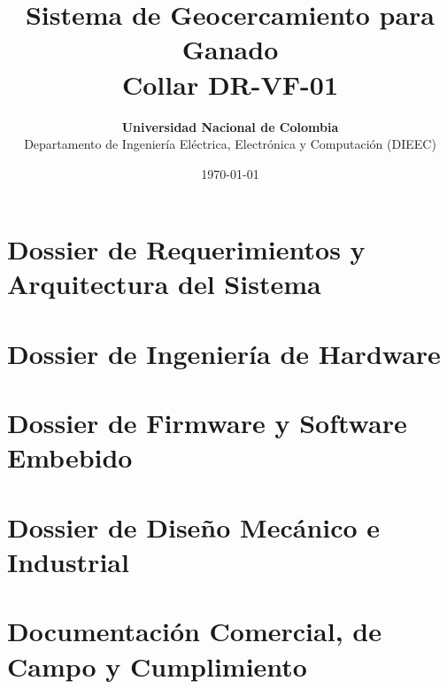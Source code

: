 \documentclass[12pt,a4paper,oneside]{report}
\title{\textbf{Sistema de Geocercamiento para Ganado\\Collar DR-VF-01}}
\author{\textbf{Universidad Nacional de Colombia}\\Departamento de Ingeniería Eléctrica, Electrónica y Computación (DIEEC)}
\date{\today}
\begin{document}

\maketitle
\thispagestyle{empty}
\clearpage

\tableofcontents
\clearpage

\listoffigures
\clearpage

\listoftables
\clearpage


\chapter{Dossier de Requerimientos y Arquitectura del Sistema}




  




\chapter{Dossier de Ingeniería de Hardware}


\chapter{Dossier de Firmware y Software Embebido}


\chapter{Dossier de Diseño Mecánico e Industrial}


\chapter{Documentación Comercial, de Campo y Cumplimiento}


%
%
\end{document}
